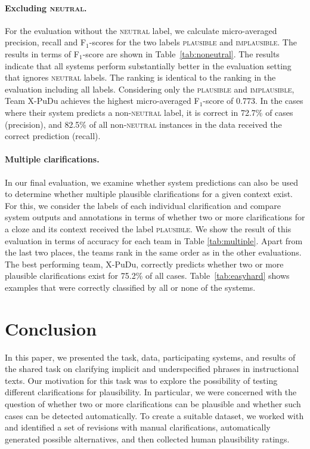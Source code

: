 \documentclass[11pt]{article}
\begin{document}
\paragraph{Excluding \textsc{neutral}.} For the evaluation without the \textsc{neutral} label, we calculate micro-averaged precision, recall and F$_1$-scores for the two labels \textsc{plausible} and \textsc{implausible}. The results in terms of F$_1$-score are shown in Table~\ref{tab:noneutral}. The results indicate that all systems perform substantially better in the evaluation setting that ignores \textsc{neutral} labels. The ranking is identical to the ranking in the evaluation including all labels. Considering only the \textsc{plausible} and \textsc{implausible}, Team X-PuDu achieves the highest micro-averaged F$_1$-score of 0.773. In the cases where their system predicts a non-\textsc{neutral} label, it is correct in 72.7\% of cases (precision), and 82.5\% of all non-\textsc{neutral} instances in the data received the correct prediction (recall). 

\paragraph{Multiple clarifications.} In our final evaluation, we examine whether system predictions can also be used to determine whether multiple plausible clarifications for a given context exist. For this, we consider the labels of each individual clarification and compare system outputs and annotations in terms of whether two or more clarifications for a cloze and its context received the label \textsc{plausible}. We show the result of this evaluation in terms of accuracy for each team in Table \ref{tab:multiple}. Apart from the last two places, the teams rank in the same order as in the other evaluations. The best performing team, X-PuDu, correctly predicts whether two or more plausible clarifications exist for 75.2\% of all cases. 
Table~\ref{tab:easyhard} shows examples that were correctly classified by all or none of the systems. 

\section{Conclusion}
\label{sec:conclusion}

In this paper, we presented the task, data, participating systems, and results of the shared task on clarifying implicit and underspecified phrases in instructional texts. Our motivation for this task was to explore the possibility of testing different clarifications for plausibility. In particular, we were concerned with the question of whether two or more clarifications can be plausible and whether such cases can be detected automatically. To create a suitable dataset, we worked with and identified a set of revisions with manual clarifications, automatically generated possible alternatives, and then collected human plausibility ratings.
\end{document}
